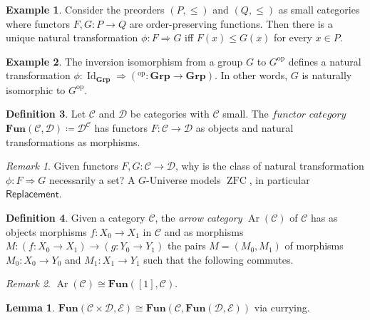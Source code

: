 \documentclass[10pt,letterpaper,cm]{nupset}
\theoremstyle{definition}
\newtheorem{definition}{Definition}
\newtheorem{exmp}[definition]{Example}
\theoremstyle{theorem}
\newtheorem{lemma}[theorem]{Lemma}
\theoremstyle{remark}
\newtheorem{remark}{Remark}
\newcommand{\1}{\mathbf{1}}
\renewcommand{\c}{\mathscr{C}}
\renewcommand{\d}{\mathscr{D}}
\newcommand{\e}{\mathscr{E}}
\newcommand{\0}{\vec 0}
\DeclareMathOperator{\id}{Id}
\DeclareMathOperator{\op}{op}
\DeclareMathOperator{\ar}{Ar}
\DeclareMathOperator{\ZFC}{ZFC}
\begin{document}
\begin{exmp}
Consider the preorders $(P, \leq)$ and $(Q, \leq)$ as small categories where functors $F, G: P \to Q$ are order-preserving functions. Then there is a unique natural transformation $\phi: F \Rightarrow G$ iff $F(x) \leq G(x)$ for every $x\in P$.
\end{exmp}

\begin{exmp}\label{grp}
The inversion isomorphism from a group $G$ to $G^{\op}$ defines a natural transformation $\phi: \id_{\mathbf{Grp}} \Rightarrow (^{\op}: \mathbf{Grp} \to \mathbf{Grp})$. In other words, $G$ is naturally isomorphic to $G^{\op}$.
\end{exmp}

\begin{definition}
Let $\c$ and $\d$ be categories with $\c$ small. The $\textit{functor category}$ $\mathbf{Fun}(\c, \d)\coloneqq \d^\c$ has functors $F: \c \to \d$ as objects and natural transformations as morphisms. 
\end{definition}

\begin{remark}
Given functors $F, G: \c \to \d$, why is the class of natural transformation $\phi: F \Rightarrow G$ necessarily a set?
A $G$-Universe models $\ZFC$, in particular $\mathsf{Replacement}$.
\end{remark}

\begin{definition}
Given a category $\c$, the \textit{arrow category} $\ar(\c)$ of $\c$ has as objects morphisms $f: X_0 \to X_1$ in $\c$ and as morphisms $M: (f: X_0 \to X_1) \to (g: Y_0 \to Y_1)$ the pairs $M=(M_0, M_1)$ of morphisms $M_0 : X_0 \to Y_0$ and $M_1 : X_1 \to Y_1$ such that the following commutes. 

\begin{center}
\end{center}

\begin{remark}$\ar(\c) \cong \mathbf{Fun}([1], \c)$.
\end{remark}
\end{definition}

\begin{lemma}
$\mathbf{Fun}(\c \times \d, \e) \cong \mathbf{Fun}(\c, \mathbf{Fun}( \d, \e))$ via currying. 
\end{lemma}
\end{document}

